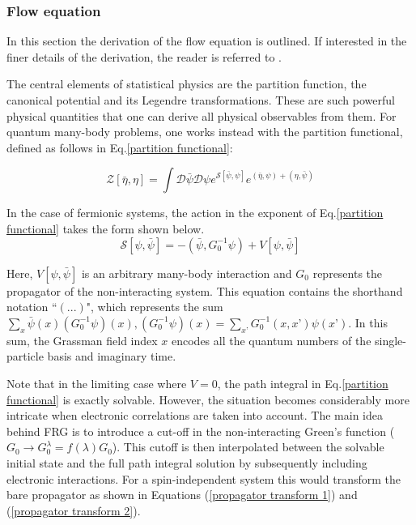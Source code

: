 \documentclass[12pt]{article}
\begin{document}
\subsubsection{Flow equation}
\label{subsubsec:Flow Equation}

In this section the derivation of the flow equation is outlined. 
If interested in the finer details of the derivation, the reader is referred to \cite{metzner2012functional}. \par
\medskip
\noindent The central elements of statistical physics are the partition function, the canonical potential and its Legendre transformations. 
These are such powerful physical quantities that one can derive all physical observables from them.
For quantum many-body problems, one works instead with the partition functional, defined as follows in Eq.\ref{partition functional}:

\begin{equation}\label{partition functional}
    \mathcal{Z}[\bar{\eta}, \eta] = \int \mathcal{D} \bar{\psi} \mathcal{D}\psi e^{\mathcal{S}[\bar{\psi}, \psi]}e^{(\bar{\eta}, \psi)+(\eta, \bar{\psi})}
\end{equation}

\noindent In the case of fermionic systems, the action in the exponent of Eq.\ref{partition functional} takes the form shown below.
\begin{equation} \label{action}
    \mathcal{S}[\psi, \bar{\psi}] = -(\bar{\psi}, G_0^{-1} \psi) + V[\psi, \bar{\psi}]
\end{equation}

\noindent Here, $V[\psi, \bar{\psi}]$ is an arbitrary many-body interaction and $G_0$ represents the propagator of the non-interacting system. 
This equation contains the shorthand notation ``$(...)$", which represents the sum $\sum_x \bar{\psi}(x)(G_0^{-1}\psi)(x), (G_0^{-1}\psi)(x) = \sum_{x’}G_0^{-1}(x,x’)\psi(x’)$. In this sum, the Grassman field index $x$ encodes all the quantum numbers of the single-particle basis and imaginary time.\par
\medskip

\noindent Note that in the limiting case where $V=0$, the path integral in Eq.\ref{partition functional} is exactly solvable. 
However, the situation becomes considerably more intricate when electronic correlations are taken into account.
The main idea behind FRG is to introduce a cut-off in the non-interacting Green's function ($G_0 \rightarrow G_0^{\lambda} = f(\lambda)G_0$). 
This cutoff is then interpolated between the solvable initial state and the full path integral solution by subsequently including electronic interactions. For a spin-independent system this would transform the 
bare propagator as shown in Equations (\ref{propagator transform 1}) and (\ref{propagator transform 2}). 
\end{document}
